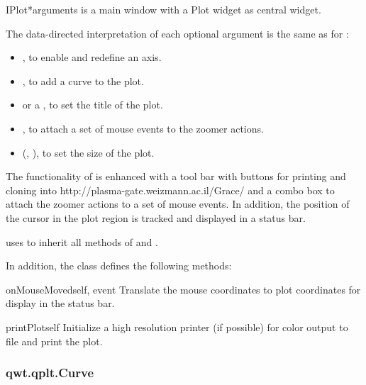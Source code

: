 \documentclass{manual}
\newcommand{\Grace}{\ulink{Grace}
  {http://plasma-gate.weizmann.ac.il/Grace/}}
\begin{document}
\begin{classdesc}{IPlot}{*arguments}
   is a main window with a Plot widget as central widget.

  The data-directed interpretation of each optional argument is the
  same as for :
  \begin{itemize}
  \item
    , to enable and redefine an axis.
  \item
    , to add a curve to the plot.
  \item
     or a , to set the title of the plot.
  \item
    , to attach a set of mouse events to the zoomer actions.
  \item
    (, ), to set the size of the plot.
  \end{itemize}

  The functionality of  is enhanced with a tool bar with
  buttons for printing and cloning into \Grace{} and a combo box to attach
  the zoomer actions to a set of mouse events.
  In addition, the position of the cursor in the plot region is tracked
  and displayed in a status bar. 

   uses  to inherit all methods of
   and .


In addition, the class  defines the following methods:

\begin{methoddesc}[Plot]{onMouseMoved}{self, event}
Translate the mouse coordinates to plot coordinates for display in the status
bar.
\end{methoddesc}

\begin{methoddesc}[IPlot]{printPlot}{self}
Initialize a high resolution printer (if possible) for color output to file and
print the plot.
\end{methoddesc}

\end{classdesc}

\subsubsection{qwt.qplt.Curve \label{intro-qplt-curve}}
\end{document}
